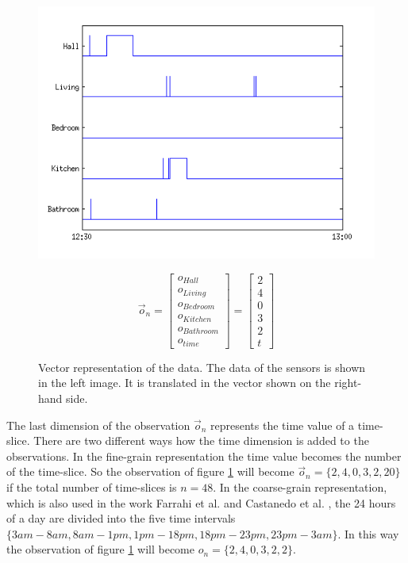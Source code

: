 \begin{figure}[h]
\centering
\begin{minipage}{0.55\linewidth}
\centering
\includegraphics[width=\textwidth]{Pictures/FeatExample.png}
\label{fig:FeatEx}
\end{minipage}
\begin{minipage}{0.35\linewidth}
\centering
\begin{equation*}
\vec{o}_n = 
 \begin{bmatrix} 
 o_{Hall}\\
 o_{Living}\\
 o_{Bedroom}\\
 o_{Kitchen}\\
 o_{Bathroom}\\
 o_{time}
 \end{bmatrix}
 =
  \begin{bmatrix} 
 2\\
 4\\
 0\\
 3\\
 2\\
 t
 \end{bmatrix}
\end{equation*}
\end{minipage}
\caption{Vector representation of the data. The data of the sensors is shown in the left image. It is translated in the vector shown on the right-hand side.}
\end{figure}

The last dimension of the observation $\vec{o}_n$ represents the time value of a time-slice. There are two different ways how the time dimension is added to the observations. In the fine-grain representation the time value becomes the number of the time-slice. So the observation of figure \ref{fig:FeatEx} will become $\vec{o}_n=\{2,4,0,3,2,20\}$ if the total number of time-slices is $n=48$. In the coarse-grain representation, which is also used in the work Farrahi et al. \cite{farrahi2008daily} and Castanedo et al. \cite{EXSY:EXSY12033}, the 24 hours of a day are divided into the five time intervals $\{ 3am - 8am, 8am - 1pm, 1pm - 18pm, 18pm - 23pm, 23pm - 3am  \}$. In this way the observation of figure \ref{fig:FeatEx} will become $o_n=\{2,4,0,3,2,2\}$.\\

